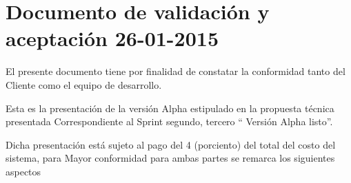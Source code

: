 \chapter{Documento de validaci\'{o}n y aceptaci\'{o}n 26-01-2015}

El presente documento tiene por finalidad de constatar la conformidad tanto del
Cliente como el equipo de desarrollo.

Esta es la presentaci\'{o}n de la versi\'{o}n Alpha estipulado en la propuesta 
t\'{e}cnica presentada Correspondiente al Sprint segundo, tercero \textquotedblleft
Versi\'{o}n Alpha listo\textquotedblright.

Dicha presentaci\'{o}n est\'{a} sujeto al pago del 4 (porciento) del total del
costo del sistema, para Mayor conformidad para ambas partes se remarca los 
siguientes aspectos

